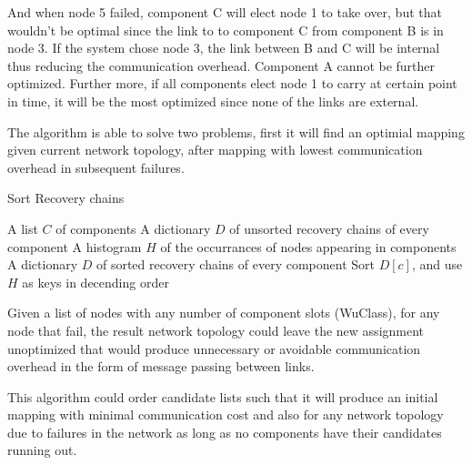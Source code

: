 And when node 5 failed, component C will elect node 1 to take over, but that
wouldn't be optimal since the link to to component C from component B is in
node 3. If the system chose node 3, the link between B and C will be internal
thus reducing the communication overhead. Component A cannot be further
optimized. Further more, if all components elect node 1 to carry at certain
point in time, it will be the most optimized since none of the links are
external.

The algorithm is able to solve two problems, first it will find an optimial
mapping given current network topology, after mapping with lowest communication
overhead in subsequent failures.


\begin{algorithm}
\caption{Sort Recovery chains}
\label{alg:sort-recovery-chain}
\begin{algorithmic}
\Require A list $C$ of components
\Require A dictionary $D$ of unsorted recovery chains of every component
\Require A histogram $H$ of the occurrances of nodes appearing in components
\Ensure A dictionary $D$ of sorted recovery chains of every component
  \State Sort $D[c]$, and use $H$ as keys in decending order
\EndFor
\end{algorithmic}
\end{algorithm}

Given a list of nodes with any number of component slots (WuClass), for any
node that fail, the result network topology could leave the new
assignment unoptimized that would produce unnecessary or avoidable
communication overhead in the form of message passing between links.

This algorithm could order candidate lists such that it will produce an initial
mapping with minimal communication cost and also for any network topology due
to failures in the network as long as no components have their candidates
running out.

